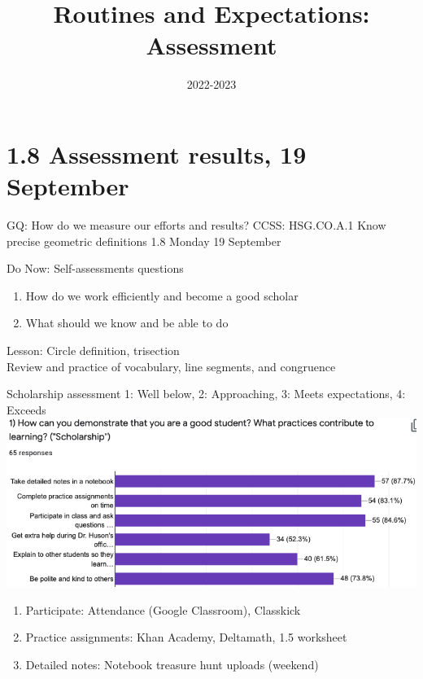 

\title{Routines and Expectations: Assessment}
\date{2022-2023}


\frame{\titlepage}

\section[Outline]{}
\frame{\tableofcontents}

\section{1.8 Assessment results, 19 September}
\begin{frame}{GQ: How do we measure our efforts and results?}
  {CCSS: HSG.CO.A.1 Know precise geometric definitions  \hfill \alert{1.8 Monday 19 September}}
  \begin{block}{Do Now: Self-assessments questions}
  \begin{enumerate}
      \item How do we work efficiently and become a good scholar
      \item What should we know and be able to do
  \end{enumerate}
  \end{block}
  Lesson: Circle definition, trisection \\
  Review and practice of vocabulary, line segments, and congruence
\end{frame}

\begin{frame}{Scholarship assessment}
  {1: Well below, 2: Approaching, 3: Meets expectations, 4: Exceeds}
  \includegraphics[width=.95\textwidth]{../graphics/scholarship-bar-chart.png}
  \begin{enumerate}
    \item Participate: Attendance (Google Classroom), Classkick
    \item Practice assignments: Khan Academy, Deltamath, 1.5 worksheet
    \item Detailed notes: Notebook treasure hunt uploads (weekend)
  \end{enumerate}
\end{frame}


